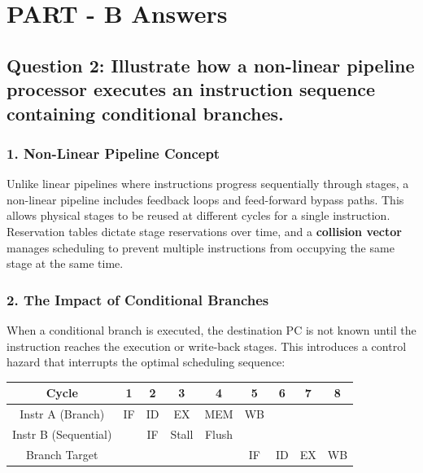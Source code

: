 \documentclass[11pt, a4paper]{article}
\begin{document}
\section*{PART - B Answers}

\subsection*{Question 2: Illustrate how a non-linear pipeline processor executes an instruction sequence containing conditional branches.}

\subsubsection*{1. Non-Linear Pipeline Concept}
Unlike linear pipelines where instructions progress sequentially through stages, a non-linear pipeline includes feedback loops and feed-forward bypass paths. This allows physical stages to be reused at different cycles for a single instruction. Reservation tables dictate stage reservations over time, and a \textbf{collision vector} manages scheduling to prevent multiple instructions from occupying the same stage at the same time.

\subsubsection*{2. The Impact of Conditional Branches}
When a conditional branch is executed, the destination PC is not known until the instruction reaches the execution or write-back stages. This introduces a control hazard that interrupts the optimal scheduling sequence:

\begin{table}[htbp]
    \centering
    \begin{tabular}{ccccccccc}
        \toprule
        Cycle & 1 & 2 & 3 & 4 & 5 & 6 & 7 & 8 \\
        \midrule
        Instr A (Branch) & IF & ID & EX & MEM & WB & & & \\
        Instr B (Sequential) & & IF & Stall & Flush & & & & \\
        Branch Target & & & & & IF & ID & EX & WB \\
        \bottomrule
    \end{tabular}
\end{table}
\end{document}

